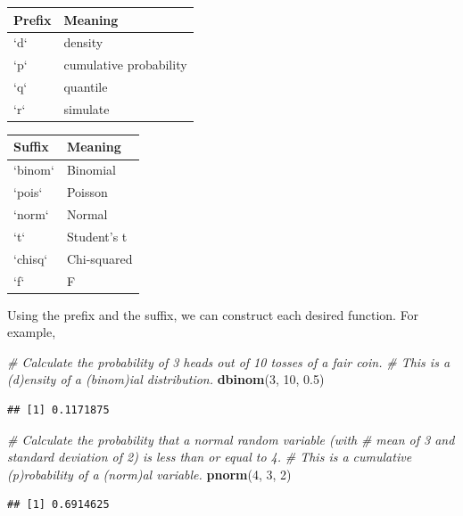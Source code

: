 \documentclass[]{book}
\newenvironment{Shaded}{\begin{snugshade}}{\end{snugshade}}
\newcommand{\CommentTok}[1]{\textcolor[rgb]{0.56,0.35,0.01}{\textit{#1}}}
\newcommand{\DecValTok}[1]{\textcolor[rgb]{0.00,0.00,0.81}{#1}}
\newcommand{\FloatTok}[1]{\textcolor[rgb]{0.00,0.00,0.81}{#1}}
\newcommand{\KeywordTok}[1]{\textcolor[rgb]{0.13,0.29,0.53}{\textbf{#1}}}
\newcommand{\NormalTok}[1]{#1}
\begin{document}
\begin{tabular}{l|l}
\hline
Prefix & Meaning\\
\hline
`d` & density\\
\hline
`p` & cumulative probability\\
\hline
`q` & quantile\\
\hline
`r` & simulate\\
\hline
\end{tabular}

\begin{tabular}{l|l}
\hline
Suffix & Meaning\\
\hline
`binom` & Binomial\\
\hline
`pois` & Poisson\\
\hline
`norm` & Normal\\
\hline
`t` & Student's t\\
\hline
`chisq` & Chi-squared\\
\hline
`f` & F\\
\hline
\end{tabular}

Using the prefix and the suffix, we can construct each desired function. For example,

\begin{Shaded}
\begin{Highlighting}[]
\CommentTok{# Calculate the probability of 3 heads out of 10 tosses of a fair coin.}
\CommentTok{# This is a (d)ensity of a (binom)ial distribution.}
\KeywordTok{dbinom}\NormalTok{(}\DecValTok{3}\NormalTok{, }\DecValTok{10}\NormalTok{, }\FloatTok{0.5}\NormalTok{)}
\end{Highlighting}
\end{Shaded}

\begin{verbatim}
## [1] 0.1171875
\end{verbatim}

\begin{Shaded}
\begin{Highlighting}[]
\CommentTok{# Calculate the probability that a normal random variable (with }
\CommentTok{# mean of 3 and standard deviation of 2) is less than or equal to 4.}
\CommentTok{# This is a cumulative (p)robability of a (norm)al variable.}
\KeywordTok{pnorm}\NormalTok{(}\DecValTok{4}\NormalTok{, }\DecValTok{3}\NormalTok{, }\DecValTok{2}\NormalTok{)}
\end{Highlighting}
\end{Shaded}

\begin{verbatim}
## [1] 0.6914625
\end{verbatim}
\end{document}
